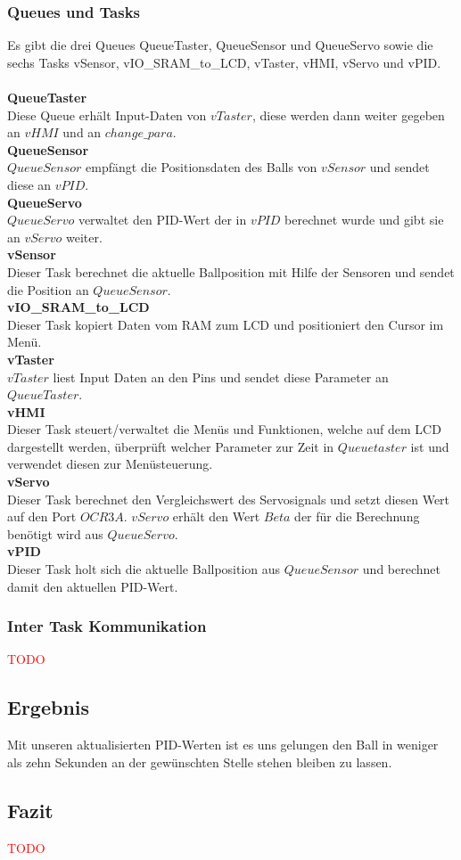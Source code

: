\subsubsection{Queues und Tasks}
Es gibt die drei Queues QueueTaster, QueueSensor und QueueServo sowie die sechs Tasks vSensor, vIO\_SRAM\_to\_LCD, vTaster, vHMI, vServo und vPID.\\
\\
{\bfseries QueueTaster}\\
Diese Queue erhält Input-Daten von $vTaster$, diese werden dann weiter gegeben an $vHMI$ und an $change\_para$.\\
{\bfseries QueueSensor} \\
$QueueSensor$ empfängt die Positionsdaten des Balls von $vSensor$ und sendet diese an $vPID$.\\
{\bfseries QueueServo} \\
$QueueServo$ verwaltet den PID-Wert der in $vPID$ berechnet wurde und gibt sie an $vServo$ weiter.\\
{\bfseries vSensor} \\
Dieser Task berechnet die aktuelle Ballposition mit Hilfe der Sensoren und sendet die Position an $QueueSensor$.\\
{\bfseries vIO\_SRAM\_to\_LCD} \\
Dieser Task kopiert Daten vom RAM zum LCD und positioniert den Cursor im Menü.\\
{\bfseries vTaster} \\
$vTaster$ liest Input Daten an den Pins und sendet diese Parameter an $QueueTaster$.\\
{\bfseries vHMI} \\
Dieser Task steuert/verwaltet die Menüs und Funktionen, welche auf dem LCD dargestellt werden, überprüft welcher Parameter zur Zeit in $Queuetaster$ ist und verwendet diesen zur Menüsteuerung.\\
{\bfseries vServo} \\
Dieser Task berechnet den Vergleichswert des Servosignals und setzt diesen Wert auf den Port $OCR3A$. $vServo$ erhält den Wert $Beta$ der für die Berechnung benötigt wird aus $QueueServo$.\\
{\bfseries vPID} \\
Dieser Task holt sich die aktuelle Ballposition aus $QueueSensor$ und berechnet damit den aktuellen PID-Wert.\\


\subsubsection{Inter Task Kommunikation}
\textcolor{red}{TODO}

\subsection{Ergebnis}
Mit unseren aktualisierten PID-Werten ist es uns gelungen den Ball in weniger als zehn Sekunden an der gewünschten Stelle stehen bleiben zu lassen.\\

\subsection{Fazit}
\textcolor{red}{TODO}